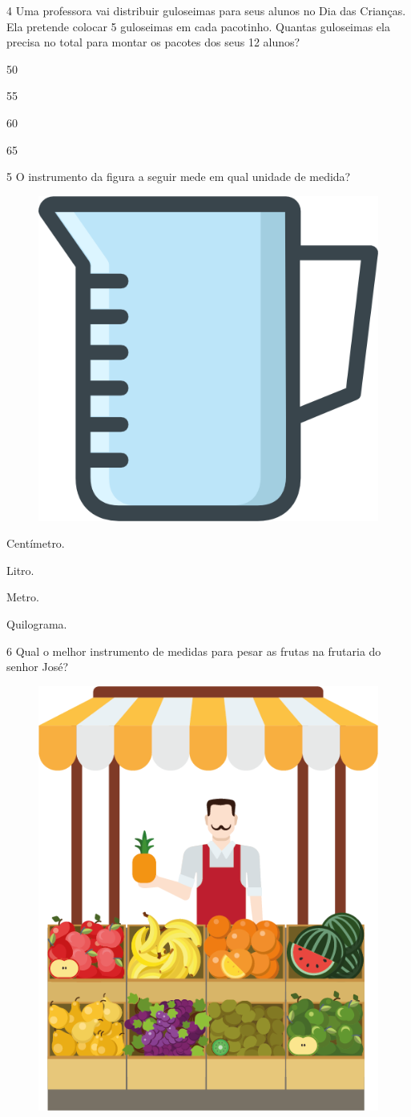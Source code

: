 \num{4} Uma professora vai distribuir guloseimas para seus alunos no Dia das
Crianças. Ela pretende colocar 5 guloseimas em cada pacotinho. Quantas
guloseimas ela precisa no total para montar os pacotes dos seus 12
alunos?

\begin{escolha}[itemsep=-5pt]
\item 50

\item 55

\item 60

\item 65
\end{escolha}

\num{5} O instrumento da figura a seguir mede em qual unidade de medida?

\begin{figure}[H]
\centering
\includegraphics[width=.3\textwidth]{./media/image153.png}
\end{figure}

\begin{escolha}[itemsep=-5pt]
\item Centímetro.

\item Litro.

\item Metro.

\item Quilograma.
\end{escolha}

\num{6} Qual o melhor instrumento de medidas para pesar as frutas na frutaria do
senhor José?

\begin{figure}[H]
\centering
\includegraphics[width=.3\textwidth]{./media/image154.png}
\end{figure}

